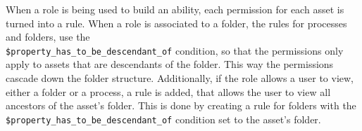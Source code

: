 %
%
%
%
%
%
%
%
%

When a role is being used to build an ability, each permission for each asset is turned into a
rule.
When a role is associated to a folder, the rules for processes and folders, use the
\\ \lstinline{$property_has_to_be_descendant_of} 
condition, so that the
permissions only apply to assets that are descendants of the folder.
This way the permissions cascade down the folder structure.
Additionally, if the role allows a user to view, either a folder or a process,
a rule is added, that allows the user to view all ancestors of the asset's folder.
This is done by creating a rule for folders 
with the \lstinline{$property_has_to_be_descendant_of} condition set to the asset's folder.


